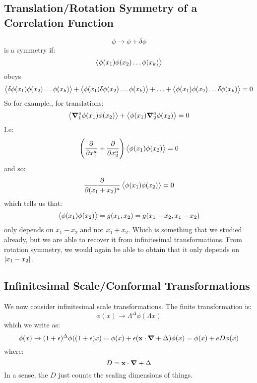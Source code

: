 \subsection{Translation/Rotation Symmetry of a Correlation Function}
\begin{equation}
    \phi \to \phi + \delta\phi
\end{equation}
is a symmetry if:
\begin{equation}
    \avg{\phi(x_1)\phi(x_2)\ldots\phi(x_k)}
\end{equation}
obeys
\begin{equation}
    \avg{\delta\phi(x_1)\phi(x_2)\ldots\phi(x_k)} + \avg{\phi(x_1)\delta\phi(x_2)\ldots\phi(x_k)} + \ldots + \avg{\phi(x_1)\phi(x_2)\ldots\delta\phi(x_k)} = 0
\end{equation}
So for example., for translations:
\begin{equation}
    \avg{\nabla^a_1\phi(x_1)\phi(x_2)} + \avg{\phi(x_1)\nabla^a_2\phi(x_2)} = 0
\end{equation}
I.e:
\begin{equation}
    \left(\dpd{}{x_1^a} + \dpd{}{x_2^a}\right)\avg{\phi(x_1)\phi(x_2)} = 0
\end{equation}
and so:
\begin{equation}
    \dpd{}{(x_1 + x_2)^a}\avg{\phi(x_1)\phi(x_2)} = 0
\end{equation}
which tells us that:
\begin{equation}
    \avg{\phi(x_1)\phi(x_2)} = g(x_1, x_2) = g(x_1 + x_2, x_1 - x_2)
\end{equation}
only depends on $x_1 - x_2$ and not $x_1 + x_2$. Which is something that we studied already, but we are able to recover it from infinitesimal transformations. From rotation symmetry, we would again be able to obtain that it only depends on $\lvert x_1 - x_2 \rvert$.

\subsection{Infinitesimal Scale/Conformal Transformations}
We now consider infinitesimal scale transformations. The finite transformation is:
\begin{equation}
    \phi(x) \to \Lambda^\Delta\phi(\Lambda x)
\end{equation}
which we write as:
\begin{equation}
    \phi(x) \to (1 + \e)^\Delta \phi((1 + \e)x) = \phi(x) + \e(\v{x} \cdot \nabla + \Delta)\phi(x) = \phi(x) + eD\phi(x)
\end{equation}
where:
\begin{equation}
    D = \v{x} \cdot \nabla + \Delta
\end{equation}
In a sense, the $D$ just counts the scaling dimensions of things. 

